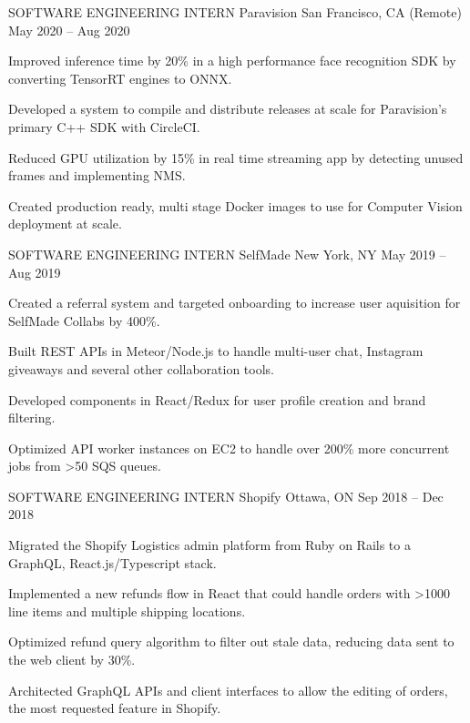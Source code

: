 \documentclass[]{awesome-cv}
\begin{document}
\vspace{-2mm}
\begin{cventries}
	\cventry
	{SOFTWARE ENGINEERING INTERN}
	{Paravision}
	{San Francisco, CA (Remote)}
	{May 2020 – Aug 2020}
	{\begin{cvitems}
		\item {Improved inference time by 20\% in a high performance face recognition SDK by converting TensorRT engines to ONNX.}
		\item {Developed a system to compile and distribute releases at scale for Paravision’s primary C++ SDK with CircleCI.}
		\item {Reduced GPU utilization by 15\% in real time streaming app by detecting unused frames and implementing NMS.}
		\item {Created production ready, multi stage Docker images to use for Computer Vision deployment at scale.}
		\end{cvitems}}
	\cventry
	{SOFTWARE ENGINEERING INTERN}
	{SelfMade}
	{New York, NY}
	{May 2019 – Aug 2019}
	{\begin{cvitems}
		\item {Created a referral system and targeted onboarding to increase user aquisition for SelfMade Collabs by 400\%.}
		\item {Built REST APIs in Meteor/Node.js to handle multi-user chat, Instagram giveaways and several other collaboration tools.}
		\item {Developed components in React/Redux for user profile creation and brand filtering.}
		\item {Optimized API worker instances on EC2 to handle over 200\% more concurrent jobs from \textgreater{}50 SQS queues.}
		\end{cvitems}}
	\cventry
	{SOFTWARE ENGINEERING INTERN}
	{Shopify}
	{Ottawa, ON}
	{Sep 2018 – Dec 2018}
	{\begin{cvitems}
		\item {Migrated the Shopify Logistics admin platform from Ruby on Rails to a GraphQL, React.js/Typescript stack.}
		\item {Implemented a new refunds flow in React that could handle orders with \textgreater{}1000 line items and multiple shipping locations.}
		\item {Optimized refund query algorithm to filter out stale data, reducing data sent to the web client by 30\%.}
		\item {Architected GraphQL APIs and client interfaces to allow the editing of orders, the most requested feature in Shopify.}

\end{cvitems}}
\end{cventries}
\end{document}
